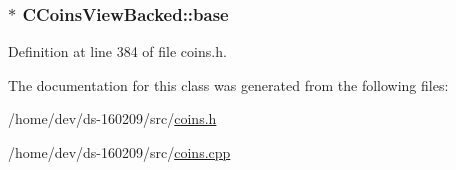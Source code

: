 \subsubsection[{base}]{$\ast$ C\+Coins\+View\+Backed\+::base\hspace{0.3cm}{\ttfamily [protected]}}\label{class_c_coins_view_backed_a901472317114adc4c104efd61dcf6203}


Definition at line 384 of file coins.\+h.



The documentation for this class was generated from the following files\+:\begin{DoxyCompactItemize}
\item 
/home/dev/ds-\/160209/src/\hyperlink{coins_8h}{coins.\+h}\item 
/home/dev/ds-\/160209/src/\hyperlink{coins_8cpp}{coins.\+cpp}\end{DoxyCompactItemize}
